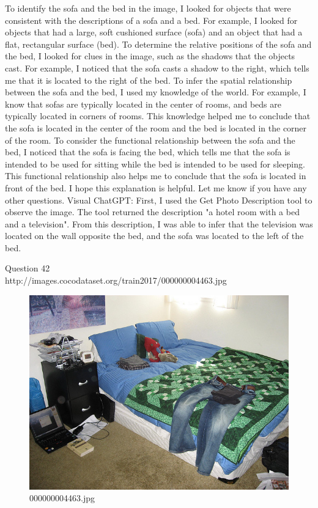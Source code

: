 \begin{enumerate}
    To identify the sofa and the bed in the image, I looked for objects that were consistent with the descriptions of a sofa and a bed. For example, I looked for objects that had a large, soft cushioned surface (sofa) and an object that had a flat, rectangular surface (bed).
    To determine the relative positions of the sofa and the bed, I looked for clues in the image, such as the shadows that the objects cast. For example, I noticed that the sofa casts a shadow to the right, which tells me that it is located to the right of the bed.
    To infer the spatial relationship between the sofa and the bed, I used my knowledge of the world. For example, I know that sofas are typically located in the center of rooms, and beds are typically located in corners of rooms. This knowledge helped me to conclude that the sofa is located in the center of the room and the bed is located in the corner of the room.
    To consider the functional relationship between the sofa and the bed, I noticed that the sofa is facing the bed, which tells me that the sofa is intended to be used for sitting while the bed is intended to be used for sleeping. This functional relationship also helps me to conclude that the sofa is located in front of the bed.
    I hope this explanation is helpful. Let me know if you have any other questions.
    \subitem Visual ChatGPT: First, I used the Get Photo Description tool to observe the image. The tool returned the description "a hotel room with a bed and a television". From this description, I was able to infer that the television was located on the wall opposite the bed, and the sofa was located to the left of the bed.
\end{enumerate}
Question 42\\
http://images.cocodataset.org/train2017/000000004463.jpg
\begin{figure}[h]
    \centering
    \includegraphics[width=0.8\linewidth]{../image set/hard/000000004463.jpg}
    \caption{000000004463.jpg}
\end{figure}
